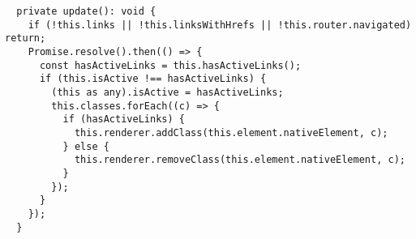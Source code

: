 \begin{verbatim}
  private update(): void {
    if (!this.links || !this.linksWithHrefs || !this.router.navigated) return;
    Promise.resolve().then(() => {
      const hasActiveLinks = this.hasActiveLinks();
      if (this.isActive !== hasActiveLinks) {
        (this as any).isActive = hasActiveLinks;
        this.classes.forEach((c) => {
          if (hasActiveLinks) {
            this.renderer.addClass(this.element.nativeElement, c);
          } else {
            this.renderer.removeClass(this.element.nativeElement, c);
          }
        });
      }
    });
  }
\end{verbatim}

